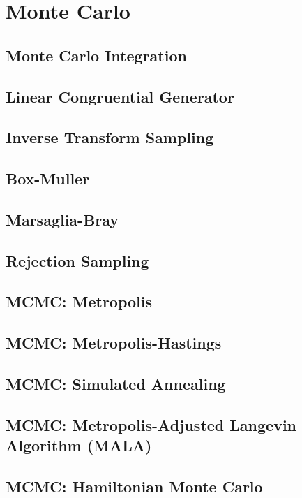 \section{Monte Carlo}
\subsection{Monte Carlo Integration}
\subsection{Linear Congruential Generator}
\subsection{Inverse Transform Sampling}
\subsection{Box-Muller}
\subsection{Marsaglia-Bray}
\subsection{Rejection Sampling}
\subsection{MCMC: Metropolis}
\subsection{MCMC: Metropolis-Hastings}
\subsection{MCMC: Simulated Annealing}
\subsection{MCMC: Metropolis-Adjusted Langevin Algorithm (MALA)}
\subsection{MCMC: Hamiltonian Monte Carlo}
